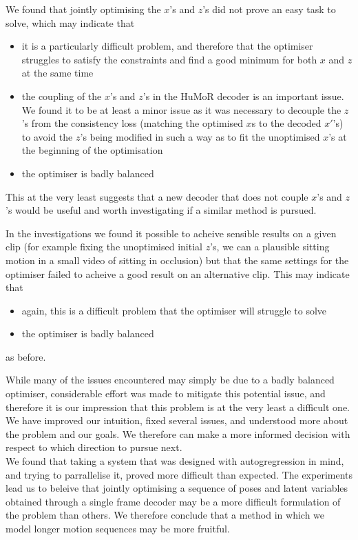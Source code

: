 We found that jointly optimising the $x$'s and $z$'s did not prove an easy task to solve, which may indicate that
\begin{itemize}
    \item it is a particularly difficult problem, and therefore that the optimiser struggles to satisfy the constraints and find a good minimum for both $x$ and $z$ at the same time
    \item the coupling of the $x$'s and $z$'s in the HuMoR decoder is an important issue. We found it to be at least a minor issue as it was necessary to decouple the $z$'s from the consistency loss (matching the optimised $x$s to the decoded $x'$'s) to avoid the $z$'s being modified in such a way as to fit the unoptimised $x$'s at the beginning of the optimisation
    \item the optimiser is badly balanced
\end{itemize}
This at the very least suggests that a new decoder that does not couple $x$'s and $z$'s would be useful and worth investigating if a similar method is pursued.

In the investigations we found it possible to acheive sensible results on a given clip (for example fixing the unoptimised initial $z$'s, we can a plausible sitting motion in a small video of sitting in occlusion) but that the same settings for the optimiser failed to acheive a good result on an alternative clip. This may indicate that 
\begin{itemize}
    \item again, this is a difficult problem that the optimiser will struggle to solve
    \item the optimiser is badly balanced
\end{itemize} as before.

While many of the issues encountered may simply be due to a badly balanced optimiser, considerable effort was made to mitigate this potential issue, and therefore it is our impression that this problem is at the very least a difficult one. We have improved our intuition, fixed several issues, and understood more about the problem and our goals. We therefore can make a more informed decision with respect to which direction to pursue next. \\
We found that taking a system that was designed with autogregression in mind, and trying to parrallelise it, proved more difficult than expected. The experiments lead us to beleive that jointly optimising a sequence of poses and latent variables obtained through a single frame decoder may be a more difficult formulation of the problem than others. We therefore conclude that a method in which we model longer motion sequences may be more fruitful.